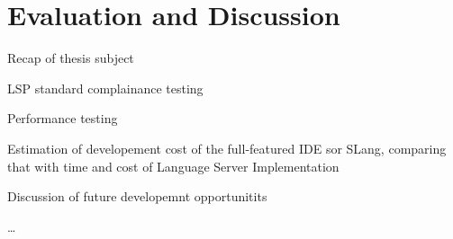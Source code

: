 \chapter{Evaluation and Discussion}
\label{chap:eval}

Recap of thesis subject

LSP standard complainance testing

Performance testing

Estimation of developement cost of the full-featured IDE sor SLang, comparing that with time and cost of Language Server Implementation

Discussion of future developemnt opportunitits

\ldots
